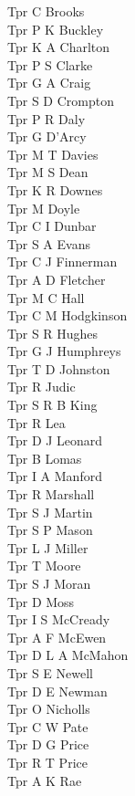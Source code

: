 \begin{multicols}{2}
  Tpr C Brooks \\
  Tpr P K Buckley \\
  Tpr K A Charlton \\
  Tpr P S Clarke \\
  Tpr G A Craig \\
  Tpr S D Crompton \\
  Tpr P R Daly \\
  Tpr G D'Arcy \\
  Tpr M T Davies \\
  Tpr M S Dean \\
  Tpr K R Downes \\
  Tpr M Doyle \\
  Tpr C I Dunbar \\
  Tpr S A Evans \\
  Tpr C J Finnerman \\
  Tpr A D Fletcher \\
  Tpr M C Hall \\
  Tpr C M Hodgkinson \\
  Tpr S R Hughes \\
  Tpr G J Humphreys \\
  Tpr T D Johnston \\
  Tpr R Judic \\
  Tpr S R B King \\
  Tpr R Lea \\
  Tpr D J Leonard \\
  Tpr B Lomas \\
  Tpr I A Manford \\
  Tpr R Marshall \\
  Tpr S J Martin \\
  Tpr S P Mason \\
  Tpr L J Miller \\
  Tpr T Moore \\
  Tpr S J Moran \\
  Tpr D Moss \\
  Tpr I S McCready \\
  Tpr A F McEwen \\
  Tpr D L A McMahon \\
  Tpr S E Newell \\
  Tpr D E Newman \\
  Tpr O Nicholls \\
  Tpr C W Pate \\
  Tpr D G Price \\
  Tpr R T Price \\
  Tpr A K Rae \\

\end{multicols}
